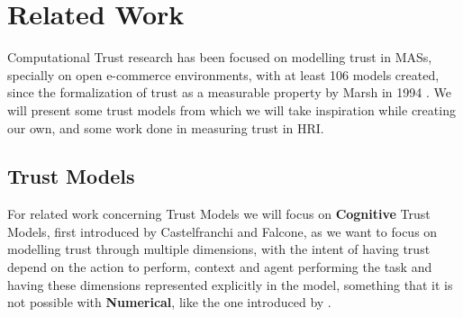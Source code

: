 

\section{Related Work}
\label{sec:Related Work}
Computational Trust research has been focused on modelling trust in \acp{MAS}, specially on open e-commerce environments\cite{Granatyr2015, HanYu2013, Pinyol2013, Noorian2010, Huang2008}, with at least 106 models created\cite{Granatyr2015}, since the formalization of trust as a measurable property by Marsh in 1994 \cite{Marsh1994}. We will present some trust models from which we will take inspiration while creating our own, and some work done in measuring trust in \ac{HRI}.

\subsection{Trust Models}
\label{subsec:Related work:Trust Models}
For related work concerning Trust Models we will focus on \textbf{Cognitive} Trust Models, first introduced by Castelfranchi and Falcone\cite{Castelfranchi1998}, as we want to focus on modelling trust through multiple dimensions, with the intent of having trust depend on the action to perform, context and agent performing the task and having these dimensions represented explicitly in the model, something that it is not possible with \textbf{Numerical}, like the one introduced by \cite{Marsh1994}.

